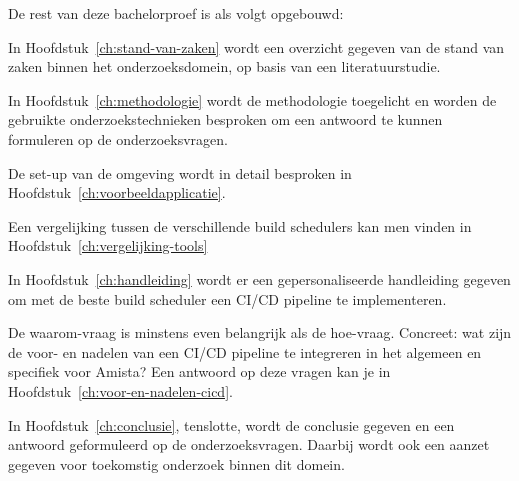 
De rest van deze bachelorproef is als volgt opgebouwd:

In Hoofdstuk~\ref{ch:stand-van-zaken} wordt een overzicht gegeven van de stand van zaken binnen het onderzoeksdomein, op basis van een literatuurstudie.

In Hoofdstuk~\ref{ch:methodologie} wordt de methodologie toegelicht en worden de gebruikte onderzoekstechnieken besproken om een antwoord te kunnen formuleren op de onderzoeksvragen.

De set-up van de omgeving wordt in detail besproken in Hoofdstuk~\ref{ch:voorbeeldapplicatie}.

Een vergelijking tussen de verschillende build schedulers kan men vinden in Hoofdstuk~\ref{ch:vergelijking-tools}

In Hoofdstuk~\ref{ch:handleiding} wordt er een gepersonaliseerde handleiding gegeven om met de beste build scheduler een CI/CD pipeline te implementeren.

De waarom-vraag is minstens even belangrijk als de hoe-vraag. Concreet: wat zijn de voor- en nadelen van een CI/CD pipeline te integreren in het algemeen en specifiek voor Amista? Een antwoord op deze vragen kan je in Hoofdstuk~\ref{ch:voor-en-nadelen-cicd}.

In Hoofdstuk~\ref{ch:conclusie}, tenslotte, wordt de conclusie gegeven en een antwoord geformuleerd op de onderzoeksvragen. Daarbij wordt ook een aanzet gegeven voor toekomstig onderzoek binnen dit domein.